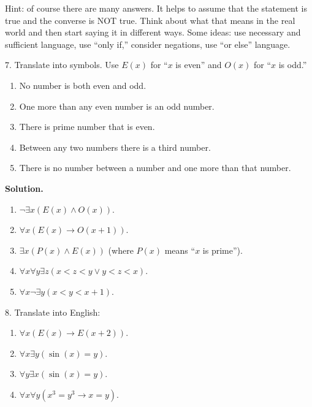 \documentclass[10pt,]{book}
\theoremstyle{plain}
\theoremstyle{definition}
\theoremstyle{definition}
\theoremstyle{definition}
\numberwithin{equation}{section}
\def\imp{\rightarrow}
\newcommand{\lt}{ < }
\begin{document}
\begin{exerciselist}
          Hint: of course there are many answers. It helps to assume that the statement is true and the converse is NOT true. Think about what that means in the real world and then start saying it in different ways. Some ideas: use necessary and sufficient language, use ``only if,'' consider negations, use ``or else'' language.
\item[7.]\hypertarget{exercise-7}{}
          Translate into symbols. Use \(E(x)\) for ``\(x\) is even'' and \(O(x)\) for ``\(x\) is odd.''
\leavevmode%
\begin{enumerate}[label=(\alph*)]
\item\hypertarget{li-127}{} No number is both even and odd. %
\item\hypertarget{li-128}{} One more than any even number is an odd number. %
\item\hypertarget{li-129}{} There is prime number that is even. %
\item\hypertarget{li-130}{} Between any two numbers there is a third number. %
\item\hypertarget{li-131}{} There is no number between a number and one more than that number. %
\end{enumerate}
\par\smallskip
\par\smallskip
\noindent\textbf{Solution.}\hypertarget{solution-13}{}\quad
\leavevmode%
\begin{enumerate}[label=(\alph*)]
\item\hypertarget{li-132}{}\(\neg \exists x (E(x) \wedge O(x))\).\item\hypertarget{li-133}{}\(\forall x (E(x) \imp O(x+1))\).\item\hypertarget{li-134}{}\(\exists x(P(x) \wedge E(x))\) (where \(P(x)\) means ``\(x\) is prime'').\item\hypertarget{li-135}{}\(\forall x \forall y \exists z(x \lt  z \lt  y \vee y \lt  z \lt  x)\).\item\hypertarget{li-136}{}\(\forall x \neg \exists y (x \lt  y \lt  x+1)\).\end{enumerate}
\item[8.]\hypertarget{exercise-8}{}
          Translate into English:
\leavevmode%
\begin{enumerate}[label=(\alph*)]
\item\hypertarget{li-137}{}\(\forall x (E(x) \imp E(x +2))\).\item\hypertarget{li-138}{}\(\forall x \exists y (\sin(x) = y)\).\item\hypertarget{li-139}{}\(\forall y \exists x (\sin(x) = y)\).\item\hypertarget{li-140}{}\(\forall x \forall y (x^3 = y^3 \imp x = y)\).\end{enumerate}

\end{exerciselist}
\end{document}
